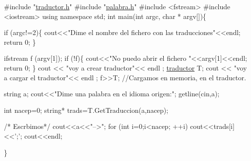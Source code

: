 \begin{DoxyCodeInclude}
\textcolor{preprocessor}{#include "\hyperlink{traductor_8h}{traductor.h}"}
\textcolor{preprocessor}{#include "\hyperlink{palabra_8h}{palabra.h}"}
\textcolor{preprocessor}{#include <fstream>}
\textcolor{preprocessor}{#include <iostream>}
\textcolor{keyword}{using namespace }std;
\textcolor{keywordtype}{int} main(\textcolor{keywordtype}{int} argc, \textcolor{keywordtype}{char} * argv[])\{

  \textcolor{keywordflow}{if} (argc!=2)\{
      cout<<\textcolor{stringliteral}{"Dime el nombre del fichero con las traducciones"}<<endl;
      \textcolor{keywordflow}{return} 0;
   \}

   ifstream f (argv[1]);
   \textcolor{keywordflow}{if} (!f)\{
    cout<<\textcolor{stringliteral}{"No puedo abrir el fichero "}<<argv[1]<<endl;
    \textcolor{keywordflow}{return} 0;
   \}
   cout << \textcolor{stringliteral}{"voy a crear traductor"}<< endl ;
   \hyperlink{classtraductor}{traductor} T;
   cout << \textcolor{stringliteral}{"voy a cargar el traductor"}<< endl ;
   f>>T; \textcolor{comment}{//Cargamos en memoria, en el traductor.}
   
   \textcolor{keywordtype}{string} a;
   cout<<\textcolor{stringliteral}{"Dime una palabra en el idioma origen:"};
   getline(cin,a);
   
   \textcolor{keywordtype}{int} nacep=0;
  \textcolor{keywordtype}{string}* trads=T.GetTraduccion(a,nacep);
   
   
   \textcolor{comment}{/* Escrbimos*/}
   cout<<a<<\textcolor{stringliteral}{"-->"};
   \textcolor{keywordflow}{for} (\textcolor{keywordtype}{int} i=0;i<nacep; ++i)
     cout<<trads[i]<<\textcolor{charliteral}{';'};
   cout<<endl;
   
   
   



\}
\end{DoxyCodeInclude}
 